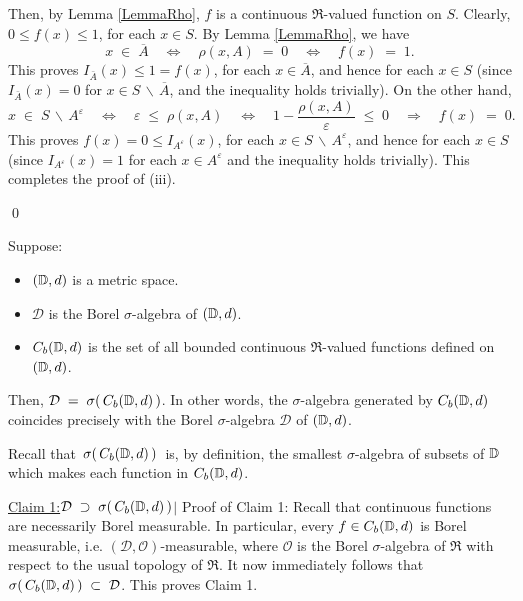 \begin{enumerate}
	Then, by Lemma \ref{LemmaRho}, $f$ is a continuous $\Re$-valued function on $S$.
	Clearly, $0 \leq f(x) \leq 1$, for each $x \in S$.
	By Lemma \ref{LemmaRho}, we have
	\begin{equation*}
	x \;\in\; \overline{A}
	\quad\Longleftrightarrow\quad
	\rho(x,A) \;=\; 0
	\quad\Longleftrightarrow\quad
	f(x) \; = \; 1.
	\end{equation*}
	This proves $I_{\bar{A}}(x) \leq 1 = f(x)$, for each $x \in \overline{A}$, and hence for each $x \in S$
	(since $I_{\bar{A}}(x) = 0$ for $x \in S\,\backslash\,\overline{A}$, and the inequality holds trivially).
	On the other hand,
	\begin{equation*}
	x \;\in\; S\,\backslash\,A^{\varepsilon}
	\quad\Longleftrightarrow\quad
	\varepsilon \;\leq\; \rho(x,A)
	\quad\Longleftrightarrow\quad
	1 - \dfrac{\rho(x,A)}{\varepsilon} \;\leq\; 0
	\quad\Longrightarrow\quad
	f(x) \;=\; 0.
	\end{equation*}
	This proves $f(x) = 0 \leq I_{A^{\varepsilon}}(x)$, for each $x \in S\,\backslash\,A^{\varepsilon}$,
	and hence for each $x \in S$ (since $I_{A^{\varepsilon}}(x) = 1$ for each $x \in A^{\varepsilon}$
	and the inequality holds trivially).
	This completes the proof of (iii).
\end{enumerate}
\qed


\begin{lemma}
\mbox{}\vskip 0.1cm
\noindent
Suppose:
\begin{itemize}
\item
	$(\mathbb{D},d)$ is a metric space.
\item
	$\mathcal{D}$ is the Borel $\sigma$-algebra of $(\mathbb{D},d)$.
\item
	$C_{b}(\mathbb{D},d)$ is the set of all bounded continuous $\Re$-valued functions defined on $(\mathbb{D},d)$.
\end{itemize}
Then, $\mathcal{D} \;=\; \sigma\!\left(\,C_{b}(\mathbb{D},d)\,\right)$.
In other words, the $\sigma$-algebra generated by $C_{b}(\mathbb{D},d)$
coincides precisely with the Borel $\sigma$-algebra $\mathcal{D}$ of $(\mathbb{D},d)$.
\end{lemma}
\proof
\vskip 0.1cm
\noindent
Recall that \,$\sigma\!\left(\,C_{b}(\mathbb{D},d)\,\right)$\, is, by definition, the smallest
$\sigma$-algebra of subsets of $\mathbb{D}$ which makes each function in $C_{b}(\mathbb{D},d)$.

\vskip 0.5cm
\noindent
\underline{Claim 1:\;\;$\mathcal{D} \;\supset\; \sigma\!\left(\,C_{b}(\mathbb{D},d)\,\right)${\color{white}$\vert$}}
\vskip 0.2cm
\noindent
Proof of Claim 1:\;\; Recall that continuous functions are necessarily Borel measurable.
In particular, every $f \in C_{b}(\mathbb{D},d)$ is Borel measurable, i.e. $(\mathcal{D},\mathcal{O})$-measurable,
where $\mathcal{O}$ is the Borel $\sigma$-algebra of $\Re$ with respect to the usual topology of $\Re$.
It now immediately follows that $\sigma\!\left(\,C_{b}(\mathbb{D},d)\,\right) \;\subset\; \mathcal{D}$.
This proves Claim 1.

